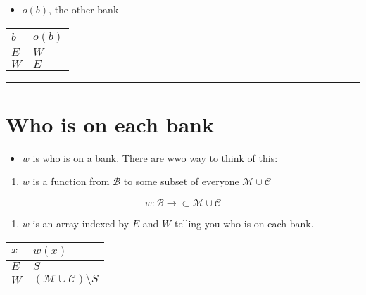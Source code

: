 \documentclass{article}
\begin{document}
\begin{itemize}

\item
  \(o(b)\), the other bank
\end{itemize}

\begin{longtable}[]{@{}ll@{}}
\toprule\noalign{}
\(b\) & \(o(b)\) \\
\midrule\noalign{}
\endhead
\bottomrule\noalign{}
\endlastfoot
\(E\) & \(W\) \\
\(W\) & \(E\) \\
\end{longtable}

\begin{center}\rule{0.5\linewidth}{0.5pt}\end{center}

\section{Who is on each bank}\label{who-is-on-each-bank}

\begin{itemize}

\item
  \(w\) is who is on a bank. There are wwo way to think of this:
\end{itemize}

\begin{enumerate}
\def\labelenumi{\arabic{enumi}.}

\item
  \(w\) is a function from \(\mathcal{B}\) to some subset of everyone
  \(\mathcal{M} \cup \mathcal{C}\)
\end{enumerate}

\[ w : \mathcal{B} \rightarrow  \subset \mathcal{M} \cup \mathcal{C}\]

\begin{enumerate}
\def\labelenumi{\arabic{enumi}.}
\setcounter{enumi}{1}

\item
  \(w\) is an array indexed by \(E\) and \(W\) telling you who is on
  each bank.
\end{enumerate}

\begin{longtable}[]{@{}ll@{}}
\toprule\noalign{}
\(x\) & \(w(x)\) \\
\midrule\noalign{}
\endhead
\bottomrule\noalign{}
\endlastfoot
\(E\) & \(S\) \\
\(W\) & \((\mathcal{M} \cup \mathcal{C})\setminus S\) \\
\end{longtable}
\end{document}
